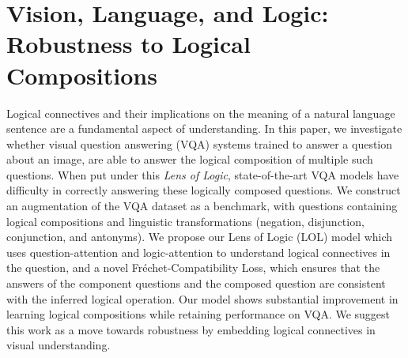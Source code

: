 \chapter{Vision, Language, and Logic: Robustness to Logical Compositions}
\label{chap:vqalol}

Logical connectives and their implications on the meaning of a natural language sentence are a fundamental aspect of understanding.
In this paper, we investigate whether visual question answering (VQA) systems trained to answer a question about an image, are able to answer the logical composition of multiple such questions.
When put under this \textit{Lens of Logic}, state-of-the-art VQA models have difficulty in correctly answering these logically composed questions.
We construct an augmentation of the VQA dataset as a benchmark, with questions containing logical compositions and linguistic transformations (negation, disjunction, conjunction, and antonyms).
We propose our {Lens of Logic (LOL)} model which uses question-attention and logic-attention to understand logical connectives in the question, and a novel Fréchet-Compatibility Loss, which ensures that the answers of the component questions and the composed question are consistent with the inferred logical operation.
Our model shows substantial improvement in learning logical compositions while retaining performance on VQA.
We suggest this work as a move towards robustness by embedding logical connectives in visual understanding.


